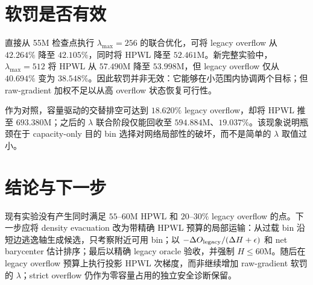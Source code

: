 \documentclass[11pt,a4paper]{ctexart}
\begin{document}
\section{软罚是否有效}
直接从 55M 检查点执行 $\lambda_{\max}=256$ 的联合优化，可将 legacy overflow 从 $42.264\%$ 降至 $42.105\%$，同时将 HPWL 降至 $52.461$M。新完整实验中，$\lambda_{\max}=512$ 将 HPWL 从 $57.490$M 降至 $53.998$M，但 legacy overflow 仅从 $40.694\%$ 变为 $38.548\%$。因此软罚并非无效：它能够在小范围内协调两个目标；但 raw-gradient 加权不足以从高 overflow 状态恢复可行性。

作为对照，容量驱动的交替排空可达到 $18.620\%$ legacy overflow，却将 HPWL 推至 $693.380$M；之后的 $\lambda$ 联合阶段仅能回收至 $594.884$M、$19.037\%$。该现象说明瓶颈在于 capacity-only 目的 bin 选择对网络局部性的破坏，而不是简单的 $\lambda$ 取值过小。

\section{结论与下一步}
现有实验没有产生同时满足 $55$--$60$M HPWL 和 $20$--$30\%$ legacy overflow 的点。下一步应将 density evacuation 改为带精确 HPWL 预算的局部运输：从过载 bin 沿短边逃逸轴生成候选，只考察附近可用 bin；以 $-\Delta O_{\rm legacy}/(\Delta H+\epsilon)$ 和 net barycenter 估计排序；最后以精确 legacy oracle 验收，并强制 $H\leq60$M。随后在 legacy overflow 预算上执行投影 HPWL 次梯度，而非继续增加 raw-gradient 软罚的 $\lambda$；strict overflow 仍作为零容量占用的独立安全诊断保留。
\end{document}
